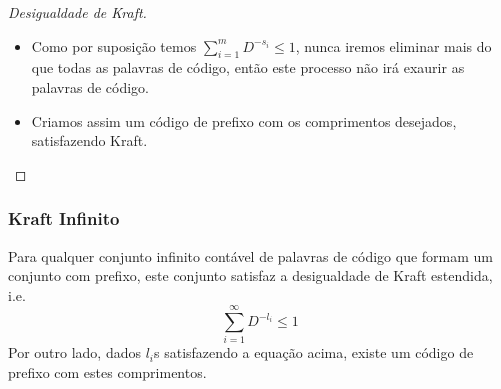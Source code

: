 \begin{frame}[allowframebreaks]
\begin{proof}[Desigualdade de Kraft]
\begin{itemize}
	estamos garantindo que estamos criando um código instantâneo (uma palavra de código não pode ser prefixo de outra).
  \item Como por suposição temos $\sum_{i=1}^{m} D^{-s_i} \leq 1$, nunca iremos eliminar mais do que todas as palavras
	de código, então este processo não irá exaurir as palavras de código.
  \item Criamos assim um código de prefixo com os comprimentos desejados, satisfazendo Kraft.
  \end{itemize}

  \end{proof}
\end{frame}


\begin{frame}[allowframebreaks]
  \frametitle{Kraft Infinito}

  \begin{theorem}
  Para qualquer conjunto infinito contável de palavras de código que formam um conjunto com prefixo,
  este conjunto satisfaz a desigualdade de Kraft estendida, i.e.
	\begin{equation}
	\sum_{i=1}^{\infty} D^{-l_i} \leq 1
	\end{equation}
  Por outro lado, dados $l_i$s satisfazendo a equação acima, existe um código de prefixo com estes comprimentos.
  \end{theorem}

  \framebreak


\end{frame}
